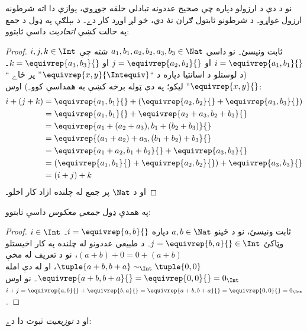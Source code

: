\documentclass[../../../include/open-logic-section]{subfiles}
\begin{document}
نو د دې د ارزولو دپاره چې صحيح عددونه تبادلي حلقه جوړوي، يوازې
دا اته شرطونه ارزول غواړو۔ د شرطونو ثابتول {ګران} نۀ دي، خو لږ
اوږد کار دے۔ د بېلګې په ډول د جمع په حالت کښې \emph{اتحاديت}
داسې ثابتوو:

\begin{proof}
$i, j, k \in \Int$ ثابت ونيسئ۔ نو داسې $a_1, b_1, a_2, b_2, a_3, b_3 \in
\Nat$ شته چې $i = \equivrep{a_1, b_1}{}$ او $j =
\equivrep{a_2,b_2}{}$ او $k = \equivrep{a_3, b_3}{}$۔ (د لوستلو
د اسانتيا دپاره د ``$\equivrep{x, y}{\Intequiv}$'' پر ځاے
``$\equivrep{x, y}{}$'' ليکو؛ په دې ټوله برخه کښې به همداسې کوو۔)
اوس:
\begin{align*}
	i + (j + k) &= \equivrep{a_1, b_1}{}+(\equivrep{a_2, b_2}{} + \equivrep{a_3, b_3}{}) \\
	&= \equivrep{a_1,  b_1}{} + \equivrep{a_2+a_3, b_2+b_3}{}\\
	&= \equivrep{a_1 + (a_2 + a_3), b_1 + (b_2 + b_3)}{}\\
	&= \equivrep{(a_1 + a_2) + a_3, (b_1 + b_2) + b_3}{}\\
	&= \equivrep{a_1 + a_2, b_1 + b_2}{} + \equivrep{a_3, b_3}{}\\
	&= (\equivrep{a_1, b_1}{} + \equivrep{a_2, b_2}{}) + \equivrep{a_3, b_3}{}\\
	&= (i+j) + k
\end{align*}
او د $\Nat$ پر جمع له چلنده ازاد کار اخلو۔
\end{proof}

په همدې ډول \emph{جمعي معکوس} داسې ثابتوو:

\begin{proof}
$i \in \Int$ ثابت ونيسئ، نو د ځينو $a,b \in \Nat$ دپاره
$i = \equivrep{a,b}{}$۔ وټاکئ $j = \equivrep{b,a}{} \in \Int$۔
د طبيعي عددونو له چلنده په کار اخيستلو
$(a+b) + 0 = 0 + (a+b)$، نو د تعريف له مخې
$\tuple{a+b, b+a} \sim_\Int \tuple{0,0}$، او له دې امله
$\equivrep{a+b, b+a}{} = \equivrep{0, 0}{} = 0_\Int$۔ نو اوس
$i + j = \equivrep{a,b}{}+\equivrep{b,a}{}=\equivrep{a+b, b+a}{}= \equivrep{0,
0}{} = 0_\Int$۔
\end{proof}

او د \emph{توزيعيت} ثبوت دا دے:
\end{document}
